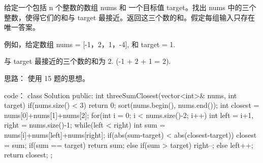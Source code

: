 给定一个包括 n 个整数的数组 nums 和 一个目标值 target。找出 nums 中的三个整数，使得它们的和与 target 最接近。返回这三个数的和。假定每组输入只存在唯一答案。

例如，给定数组 nums = [-1，2，1，-4], 和 target = 1.

与 target 最接近的三个数的和为 2. (-1 + 2 + 1 = 2).








































思路：
使用 15 题的思想。




































code：
class Solution {
public:
    int threeSumClosest(vector<int>& nums, int target) {
        if(nums.size() < 3) return 0;
        sort(nums.begin(), nums.end());
        int closest = nums[0]+nums[1]+nums[2];
        for(int i = 0; i < nums.size()-2; i++)
        {
            int left = i+1, right = nums.size()-1;
            while(left < right)
            {
                int sum = nums[i]+nums[left]+nums[right];
                if(abs(sum-target) < abs(closest-target))
                {
                    closest = sum;
                }
                if(sum == target) return sum;
                else if(sum > target) right--;
                else left++;
            }
        }
        return closest;
    }
};